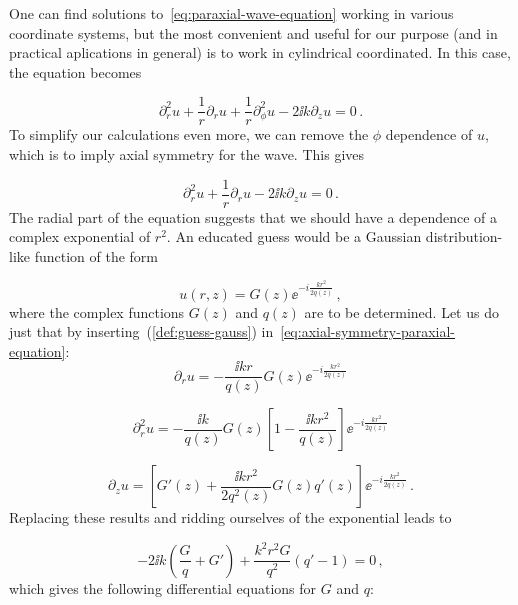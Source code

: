\documentclass[12pt, class=report, crop=false]{standalone}
\begin{document}
One can find solutions to~\cref{eq:paraxial-wave-equation} working in various coordinate systems, but the most convenient and useful for our purpose (and in practical aplications in general) is to work in cylindrical coordinated. In this case, the equation becomes

\begin{equation}
  \partial_r^2 u +\frac{1}{r} \partial_r u + \frac{1}{r} \partial_\phi^2 u - 2 \ii k \partial_z u = 0 \,.
\end{equation}
To simplify our calculations even more, we can remove the \(\phi\) dependence of \(u\), which is to imply axial symmetry for the wave. This gives

\begin{equation}
  \label{eq:axial-symmetry-paraxial-equation}
  \partial_r^2 u +\frac{1}{r} \partial_r u- 2 \ii k \partial_z u = 0 \,.
\end{equation}
The radial part of the equation suggests that we should have a dependence of a complex exponential of \(r^2\). An educated guess would be a Gaussian distribution-like function of the form

\begin{equation}
  \label{def:guess-gauss}
  u(r,z) = G(z) \ee^{-i\frac{kr^2}{2q(z)}} \,,
\end{equation}
where the complex functions \(G(z)\) and \(q(z)\) are to be determined. Let us do just that by inserting~(\ref{def:guess-gauss}) in~\cref{eq:axial-symmetry-paraxial-equation}:
\begin{equation*}
  \partial_r u = - \frac{\ii k r}{q(z)}G(z) \ee^{-i\frac{kr^2}{2q(z)}}
\end{equation*}

\begin{equation*}
  \partial_r^2 u =- \frac{\ii k}{q(z)}G(z) \left[1 - \frac{\ii k r^2}{q(z)} \right]\ee^{-i\frac{kr^2}{2q(z)}}
\end{equation*}

\begin{equation*}
  \partial_z u = \left[G'(z) + \frac{\ii k r^2}{2 q^2 (z)} G(z) q'(z)\right] \ee^{-i\frac{kr^2}{2q(z)}} \,.
\end{equation*}
Replacing these results and ridding ourselves of the exponential leads to

\begin{equation}
  -2 \ii k \left(\frac{G}{q} + G' \right) + \frac{k^2 r^2 G}{q^2} (q'-1) = 0\,,
\end{equation}
which gives the following differential equations for \(G\) and \(q\):
\end{document}
